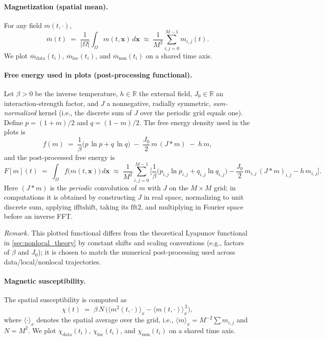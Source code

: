 \documentclass[11pt,a4paper]{article}
\begin{document}
\paragraph{Magnetization (spatial mean).} For any field $m(t,\cdot)$,
\begin{equation}
    \overline{m}(t) \;=\; \frac{1}{|\Omega|} \int_{\Omega} m(t,\mathbf{x})\,d\mathbf{x}
    \;\approx\; \frac{1}{M^2} \sum_{i,j=0}^{M-1} m_{i,j}(t).
\end{equation}
We plot $\overline{m}_{\text{data}}(t_i)$, $\overline{m}_{\text{loc}}(t_i)$, and $\overline{m}_{\text{non}}(t_i)$ on a shared time axis.

\paragraph{Free energy used in plots (post-processing functional).} Let $\beta>0$ be the inverse temperature, $h\in\mathbb{R}$ the external field, $J_0\in\mathbb{R}$ an interaction-strength factor, and $J$ a nonnegative, radially symmetric, \emph{sum-normalized} kernel (i.e., the discrete sum of $J$ over the periodic grid equals one). Define $p=(1+m)/2$ and $q=(1-m)/2$. The free energy density used in the plots is
\begin{equation}
    f(m) \;=\; \frac{1}{\beta}\Big( p\,\ln p + q\,\ln q \Big)
    \; -\; \frac{J_0}{2}\, m\, (J*m)
    \; -\; h\, m,
\end{equation}
and the post-processed free energy is
\begin{equation}
    F[m](t) \;=\; \int_{\Omega} f\big(m(t,\mathbf{x})\big)\,d\mathbf{x}
    \;\approx\; \frac{1}{M^2} \sum_{i,j=0}^{M-1} \Bigg[ \frac{1}{\beta}\Big( p_{i,j}\ln p_{i,j} + q_{i,j}\ln q_{i,j} \Big)
    - \frac{J_0}{2}\, m_{i,j}\, (J*m)_{i,j}
    - h\, m_{i,j} \Bigg].
\end{equation}
Here $(J*m)$ is the \emph{periodic} convolution of $m$ with $J$ on the $M\times M$ grid; in computations it is obtained by constructing $J$ in real space, normalizing to unit discrete sum, applying $\mathrm{ifftshift}$, taking its $\mathrm{fft2}$, and multiplying in Fourier space before an inverse FFT.

\emph{Remark.} This plotted functional differs from the theoretical Lyapunov functional in \cref{sec:nonlocal_theory} by constant shifts and scaling conventions (e.g., factors of $\beta$ and $J_0$); it is chosen to match the numerical post-processing used across data/local/nonlocal trajectories.

\paragraph{Magnetic susceptibility.} The spatial susceptibility is computed as
\begin{equation}
    \chi(t) \;=\; \beta\,N\,\Big( \langle m^2(t,\cdot)\rangle_x - \langle m(t,\cdot)\rangle_x^{\,2} \Big),
\end{equation}
where $\langle\cdot\rangle_x$ denotes the spatial average over the grid, i.e., $\langle m\rangle_x = M^{-2}\sum m_{i,j}$ and $N=M^2$. We plot $\chi_{\text{data}}(t_i)$, $\chi_{\text{loc}}(t_i)$, and $\chi_{\text{non}}(t_i)$ on a shared time axis.
\end{document}
